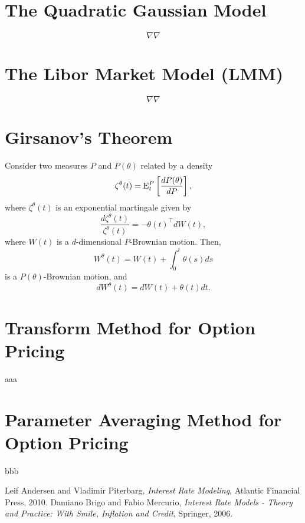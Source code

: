\documentclass[12pt]{article}
\begin{document}
\section{The Quadratic Gaussian Model}

  $$\nabla\nabla$$



\section{The Libor Market Model (LMM)}

  $$\nabla\nabla$$

\appendix

  \section{Girsanov's Theorem}
  \label{Girsanov}

  Consider two measures $P$ and $P(\theta)$ related by a density
  \begin{equation}
    \zeta^{\theta}(t) = {\rm E}_t^P\left[\frac{dP(\theta)}{dP}\right],
  \end{equation}
  where $\zeta^{\theta}(t)$ is an exponential martingale given by
  \begin{equation}
    \frac{d\zeta^{\theta}(t)}{\zeta^{\theta}(t)}=-\theta(t)^{\top}dW(t),
  \end{equation}
  where $W(t)$ is a $d$-dimensional $P$-Brownian motion. Then,
  \begin{equation}
    W^{\theta}(t) = W(t)+\int_0^t\theta(s)ds
  \end{equation}
  is a $P(\theta)$-Brownian motion, and
  \begin{equation}
    dW^{\theta}(t) = dW(t)+ \theta(t)dt.
  \end{equation}

  \section{Transform Method for Option Pricing}
  \label{fourier}

  aaa

  \section{Parameter Averaging Method for Option Pricing}
  \label{PA}

  bbb



\begin{thebibliography}{1}

 Leif Andersen and Vladimir Piterbarg, {\it Interest Rate Modeling}, Atlantic Financial Press, 2010.
 Damiano Brigo and Fabio Mercurio, {\it Interest Rate Models - Theory and Practice: With Smile, Inflation and Credit}, Springer, 2006.


\end{thebibliography}
\end{document}
